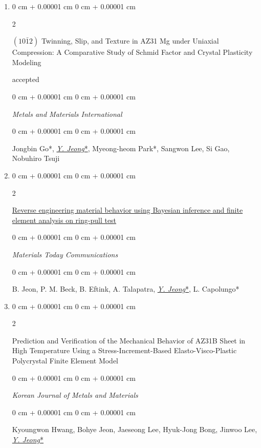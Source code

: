 \documentclass[10pt, letterpaper]{article}
\newenvironment{onecolentry}{
    \begin{adjustwidth}{
        0 cm + 0.00001 cm
    }{
        0 cm + 0.00001 cm
    }
}{
    \end{adjustwidth}
} %
\newenvironment{twocolentry}[2][]{
    \onecolentry
    \def\secondColumn{#2}
    \setcolumnwidth{\fill, 4.5 cm}
    \begin{paracol}{2}
}{
    \switchcolumn \raggedleft \secondColumn
    \end{paracol}
    \endonecolentry
} %
\begin{document}
\begin{enumerate}
        \item
          \begin{twocolentry}{accepted}
            $(10\bar{1}2)$ Twinning, Slip, and Texture in AZ31 Mg under Uniaxial Compression: A Comparative Study of Schmid Factor and Crystal Plasticity Modeling
          \end{twocolentry}
        \begin{onecolentry}
          {\it Metals and Materials International}
        \end{onecolentry}
          \begin{onecolentry}
            Jongbin Go*,  {\underline{\textit{Y. Jeong}*}}, Myeong-heom Park*, Sangwon Lee, Si Gao, Nobuhiro Tsuji
          \end{onecolentry}
          \vspace{0.10 cm}


        \item
          \begin{twocolentry}{2027}
            \href{https://doi.org/10.1016/j.mtcomm.2026.116674}{Reverse engineering material behavior using Bayesian inference and finite element analysis on ring-pull test}
          \end{twocolentry}
        \begin{onecolentry}
          {\it Materials Today Communications}
        \end{onecolentry}
          \begin{onecolentry}
            B. Jeon, P. M. Beck, B. Eftink, A. Talapatra, {\underline{\textit{Y. Jeong}*}}, L. Capolungo*
          \end{onecolentry}
          \vspace{0.10 cm}

        \item
          \begin{twocolentry}{2027}
            Prediction and Verification of the Mechanical Behavior of AZ31B Sheet in High Temperature Using a Stress-Increment-Based Elasto-Visco-Plastic Polycrystal Finite Element Model
          \end{twocolentry}
          \begin{onecolentry}
            {\it Korean Journal of Metals and Materials}
          \end{onecolentry}
          \begin{onecolentry}
            {Kyoungwon Hwang, Bohye Jeon, Jaeseong Lee, Hyuk-Jong Bong, Jinwoo Lee, \underline{\textit{Y. Jeong}*}}
          \end{onecolentry}
          \vspace{0.10 cm}



\end{enumerate}
\end{document}
